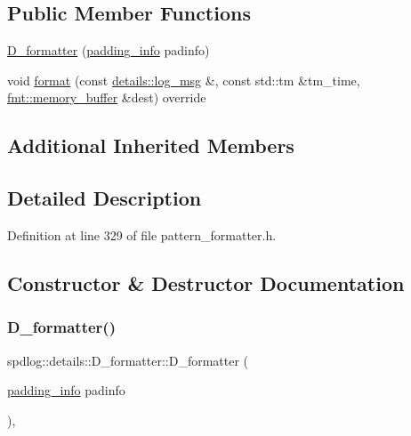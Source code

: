 \subsection*{Public Member Functions}
\begin{DoxyCompactItemize}
\item 
\hyperlink{classspdlog_1_1details_1_1_d__formatter_a2df2757737cfb0580fcf50edd83efd02}{D\+\_\+formatter} (\hyperlink{structspdlog_1_1details_1_1padding__info}{padding\+\_\+info} padinfo)
\item 
void \hyperlink{classspdlog_1_1details_1_1_d__formatter_a065cf427de180dfee0b6abb642a78cb0}{format} (const \hyperlink{structspdlog_1_1details_1_1log__msg}{details\+::log\+\_\+msg} \&, const std\+::tm \&tm\+\_\+time, \hyperlink{format_8h_a21cbf729f69302f578e6db21c5e9e0d2}{fmt\+::memory\+\_\+buffer} \&dest) override
\end{DoxyCompactItemize}
\subsection*{Additional Inherited Members}


\subsection{Detailed Description}


Definition at line 329 of file pattern\+\_\+formatter.\+h.



\subsection{Constructor \& Destructor Documentation}
\mbox{\label{classspdlog_1_1details_1_1_d__formatter_a2df2757737cfb0580fcf50edd83efd02}} 
\subsubsection{\texorpdfstring{D\+\_\+formatter()}{D\_formatter()}}
{\footnotesize\ttfamily spdlog\+::details\+::\+D\+\_\+formatter\+::\+D\+\_\+formatter (\begin{DoxyParamCaption}\item[{\hyperlink{structspdlog_1_1details_1_1padding__info}{padding\+\_\+info}}]{padinfo }\end{DoxyParamCaption})\hspace{0.3cm}{\ttfamily [inline]}, {\ttfamily [explicit]}}



